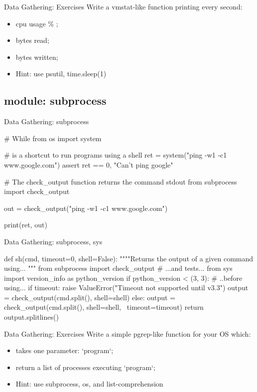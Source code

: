 \begin{frame}[fragile]{Data Gathering: Exercises}
Write a vmstat-like function printing every second:
\begin{itemize}
\item cpu usage \% ;
\item bytes read;
\item bytes written;
\item Hint: use psutil, time.sleep(1)
\end{itemize}
\end{frame}

\subsection{module: subprocess}
\begin{frame}[fragile]{Data Gathering: subprocess}
\begin{pythoncode}
# While 
from os import system

# is a shortcut to run programs using a shell
ret = system("ping -w1 -c1 www.google.com")
assert ret == 0, "Can't ping google"

# The check_output function returns the command stdout
from subprocess import check_output

out = check_output("ping -w1 -c1 www.google.com")

print(ret, out)
\end{pythoncode}
\end{frame}

\begin{frame}[fragile]{Data Gathering: subprocess, sys}
\begin{pythoncode}
def sh(cmd, timeout=0, shell=False):
  """"Returns the output of a given command using... """
  from subprocess import check_output # ...and tests...
  from sys import version_info as python_version
  if python_version < (3, 3): # ..before using...
    if timeout:
      raise ValueError("Timeout not supported until v3.3")
    output = check_output(cmd.split(), shell=shell)
  else:
    output = check_output(cmd.split(), shell=shell, \
                          timeout=timeout)
  return output.splitlines()
    
\end{pythoncode}
\end{frame}

\begin{frame}[fragile]{Data Gathering: Exercises}
Write a simple pgrep-like function for your OS which:
\begin{itemize}
\item takes one parameter: `program`;
\item return a list of processes executing `program`;
\item Hint: use subprocess, os, and list-comprehension
\end{itemize}
\end{frame}


